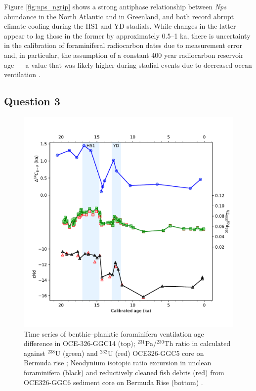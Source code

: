 Figure \ref{fig:nps_ngrip} shows a strong antiphase relationship between \emph{Nps} abundance in the North Atlantic and \delO{} in Greenland, and both record abrupt climate cooling during the HS1 and YD stadials.
While changes in the latter appear to lag those in the former by approximately 0.5--1 ka, there is uncertainty in the calibration of foraminiferal \fC{} radiocarbon dates due to measurement error and, in particular, the assumption of a constant 400 year radiocarbon reservoir age --- a value that was likely higher during stadial events due to decreased ocean ventilation \parencite{bard1994north, hughen2004marine04}.

            
\subsection{Question 3}
\label{sec:Q2.3}
\begin{figure}[p]
\includegraphics[width=\textwidth]{img/timeseries_B-P_PaTh_eNd}
    \caption{Time series of benthic--planktic foraminifera \fC{} ventilation age difference in OCE-326-GGC14 (top);
             $^{231}$Pa/$^{230}$Th ratio in calculated against $^{238}$U (green) and $^{232}$U (red) OCE326-GGC5 core on Bermuda rise \parencite[data from][]{mcmanus2004collapse};
             Neodynium isotopic ratio excursion in unclean foraminifera (black) and reductively cleaned fish debris (red) from OCE326-GGC6 sediment core on Bermuda Rise (bottom) \parencite[data from][]{roberts2010synchronous}.}
            \label{fig:bp_path_end}
\end{figure}
